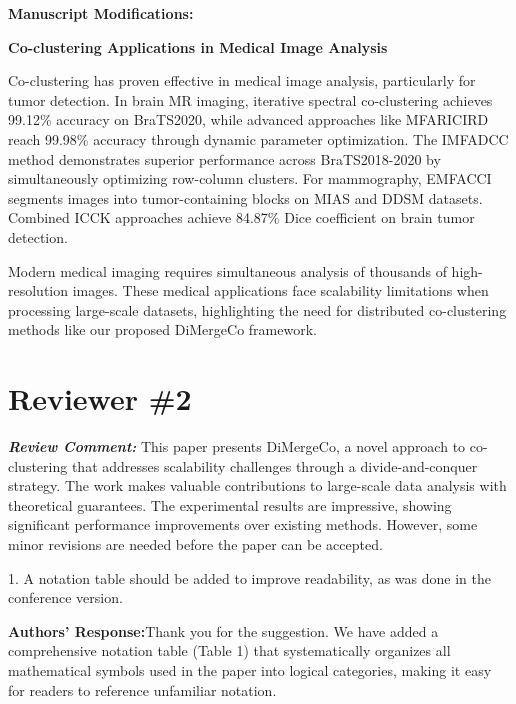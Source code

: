 \documentclass{ar2rc}
\renewcommand{\RC}[1]{\textbf{\textit{Review Comment:}} #1}
\renewcommand{\AR}{\textbf{Authors' Response:}}
\begin{document}
\textbf{Manuscript Modifications:}

\textbf{Co-clustering Applications in Medical Image Analysis}

Co-clustering has proven effective in medical image analysis, particularly for tumor detection. In brain MR imaging, iterative spectral co-clustering achieves 99.12\% accuracy on BraTS2020\cite{farnoosh2024DevelopmentUnsupervisedPseudodeep}, while advanced approaches like MFARICIRD reach 99.98\% accuracy through dynamic parameter optimization\cite{farnoosh2025PseudodeepUnsupervisedModelbased}. The IMFADCC method demonstrates superior performance across BraTS2018-2020 by simultaneously optimizing row-column clusters\cite{farnoosh2024BrainMagneticResonance}. For mammography, EMFACCI segments images into tumor-containing blocks on MIAS and DDSM datasets\cite{farnoosh2024NovelApproachAutomatic}. Combined ICCK approaches achieve 84.87\% Dice coefficient on brain tumor detection\cite{farnoosh2022ApplicationModifiedCombinational}.

Modern medical imaging requires simultaneous analysis of thousands of high-resolution images. These medical applications face scalability limitations when processing large-scale datasets, highlighting the need for distributed co-clustering methods like our proposed DiMergeCo framework.


\section{Reviewer \#2}

\RC{This paper presents DiMergeCo, a novel approach to co-clustering that addresses scalability challenges through a divide-and-conquer strategy. The work makes valuable contributions to large-scale data analysis with theoretical guarantees. The experimental results are impressive, showing significant performance improvements over existing methods. However, some minor revisions are needed before the paper can be accepted.

  1. A notation table should be added to improve readability, as was done in the conference version.}

\AR Thank you for the suggestion. We have added a comprehensive notation table (Table 1) that systematically organizes all mathematical symbols used in the paper into logical categories, making it easy for readers to reference unfamiliar notation.
\end{document}
